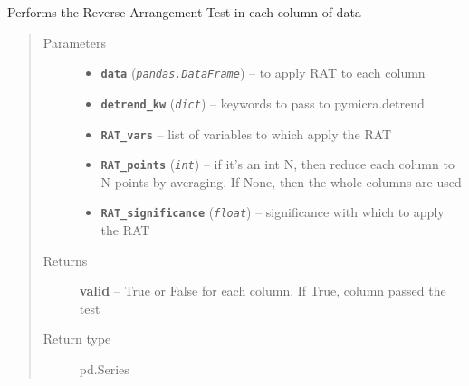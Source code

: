 \documentclass[a4paper,10pt,oneside]{sphinxmanual}
\begin{document}
\begin{fulllineitems}
\label{pymicra:pymicra.tests.check_RA}
Performs the Reverse Arrangement Test in each column of data
\begin{quote}\begin{description}
\item[{Parameters}] \leavevmode\begin{itemize}
\item {} 
\textbf{\texttt{data}} (\emph{\texttt{pandas.DataFrame}}) -- to apply RAT to each column

\item {} 
\textbf{\texttt{detrend\_kw}} (\emph{\texttt{dict}}) -- keywords to pass to pymicra.detrend

\item {} 
\textbf{\texttt{RAT\_vars}} -- list of variables to which apply the RAT

\item {} 
\textbf{\texttt{RAT\_points}} (\emph{\texttt{int}}) -- if it's an int N, then reduce each column to N points by averaging. If None,
then the whole columns are used

\item {} 
\textbf{\texttt{RAT\_significance}} (\emph{\texttt{float}}) -- significance with which to apply the RAT

\end{itemize}

\item[{Returns}] \leavevmode
\textbf{valid} -- True or False for each column. If True, column passed the test

\item[{Return type}] \leavevmode
pd.Series

\end{description}\end{quote}

\end{fulllineitems}

\end{document}
